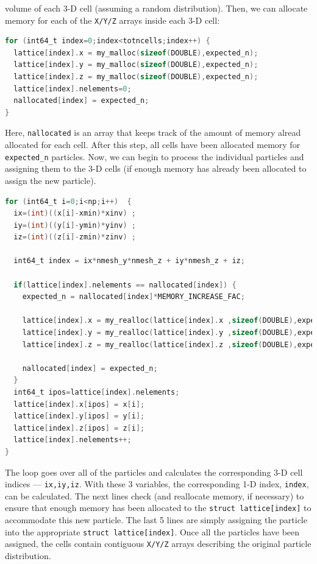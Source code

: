 \documentclass[12pt,titlepage,justified]{article}
\begin{document}
volume of each 3-D cell (assuming a random distribution). Then, we can allocate memory for each of the \texttt{X/Y/Z} arrays inside each 3-D cell:
\begin{lstlisting}[language=C,numbers=none,label={code:malloc_cellarray},caption={Pre-allocating memory for the \texttt{X/Y/Z} arrays in \texttt{struct cellarray}.},basicstyle=\scriptsize]
for (int64_t index=0;index<totncells;index++) {
  lattice[index].x = my_malloc(sizeof(DOUBLE),expected_n);
  lattice[index].y = my_malloc(sizeof(DOUBLE),expected_n);
  lattice[index].z = my_malloc(sizeof(DOUBLE),expected_n);
  lattice[index].nelements=0;
  nallocated[index] = expected_n;
}
\end{lstlisting}
Here, \texttt{nallocated} is an array that keeps track of the amount of memory alread allocated for each cell. After this step, all cells have been allocated memory for \texttt{expected\_n} 
particles. Now, we can begin to process the individual particles and assigning them to the 3-D cells (if enough memory has already been allocated to assign the new particle). 
\begin{lstlisting}[language=C,numbers=none,label={code:assign_to_cellarray},caption={Assigning the particles to the \texttt{struct cellarray} in the cell.},basicstyle=\scriptsize]
for (int64_t i=0;i<np;i++)  {
  ix=(int)((x[i]-xmin)*xinv) ;
  iy=(int)((y[i]-ymin)*yinv) ;
  iz=(int)((z[i]-zmin)*zinv) ;

  int64_t index = ix*nmesh_y*nmesh_z + iy*nmesh_z + iz;
  
  if(lattice[index].nelements == nallocated[index]) {
    expected_n = nallocated[index]*MEMORY_INCREASE_FAC;
    
    lattice[index].x = my_realloc(lattice[index].x ,sizeof(DOUBLE),expected_n,''lattice.x'');
    lattice[index].y = my_realloc(lattice[index].y ,sizeof(DOUBLE),expected_n,''lattice.y'');
    lattice[index].z = my_realloc(lattice[index].z ,sizeof(DOUBLE),expected_n,''lattice.z'');
    
    nallocated[index] = expected_n;
  }
  int64_t ipos=lattice[index].nelements;
  lattice[index].x[ipos] = x[i];
  lattice[index].y[ipos] = y[i];
  lattice[index].z[ipos] = z[i];
  lattice[index].nelements++;
}
\end{lstlisting}
The loop goes over all of the particles and calculates the corresponding 3-D cell indices --- \texttt{ix,iy,iz}. With these 3 variables, the corresponding 1-D index, \texttt{index}, can be 
calculated. The next lines check (and reallocate memory, if necessary) to ensure that enough memory has been allocated to the \texttt{struct lattice[index]} to accommodate this new particle. 
The last 5 lines are simply assigning the particle into the appropriate \texttt{struct lattice[index]}. Once all the particles have been assigned, the cells contain contiguous \texttt{X/Y/Z} 
arrays describing the original particle distribution. 
\end{document}
